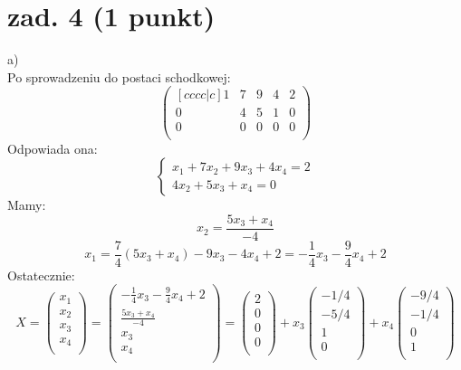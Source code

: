 \documentclass{article}
\begin{document}
\section{zad. 4 (1 punkt)}
a)
\\
Po sprowadzeniu do postaci schodkowej:
$$
\begin{pmatrix}[cccc|c]
1 & 7 & 9 & 4 & 2 \\
0 & 4 & 5 & 1 & 0 \\
0 & 0 & 0 & 0 & 0 \\
\end{pmatrix}
$$
Odpowiada ona:
$$\begin{cases} x_1+7x_2+9x_3+4x_4=2 \\ 4x_2+5x_3+x_4 = 0\end{cases}$$
Mamy:
$$x_2 = \frac{5x_3 + x_4}{-4}$$
$$x_1 = \frac{7}{4}(5x_3+x_4) - 9x_3 -4x_4 +2 = -\frac{1}{4}x_3 - \frac{9}{4}x_4 + 2$$
Ostatecznie:
$$
X = \begin{pmatrix}
    x_1 \\
    x_2 \\
    x_3 \\
    x_4 \\
    \end{pmatrix}
    =
    \begin{pmatrix}
    -\frac{1}{4}x_3 - \frac{9}{4}x_4 + 2 \\
    \frac{5x_3 + x_4}{-4} \\
    x_3 \\
    x_4 \\
    \end{pmatrix}
    =
    \begin{pmatrix}
    2 \\
    0 \\
    0 \\
    0 \\
    \end{pmatrix}
    +
    x_3
    \begin{pmatrix}
    -1/4 \\
    -5/4 \\
    1 \\
    0 \\
    \end{pmatrix}
    +
    x_4
    \begin{pmatrix}
    -9/4 \\
    -1/4 \\
    0 \\
    1 \\
    \end{pmatrix}
$$
\end{document}
